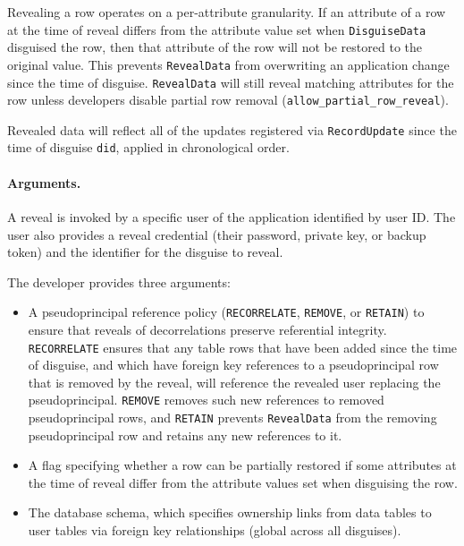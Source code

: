     Revealing a row operates on a per-attribute granularity. If an attribute of
    a row at the time of reveal differs from the attribute value set when
    \texttt{DisguiseData} disguised the row, then that attribute of the row will
    not be restored to the original value. This prevents \texttt{RevealData}
    from overwriting an application change since the time of disguise. 
    \texttt{RevealData} will still reveal matching attributes for the row unless
    developers disable partial row removal
    (\texttt{allow\_partial\_row\_reveal}).

    Revealed data will reflect all of the updates registered via
    \texttt{RecordUpdate} since the time of disguise \texttt{did}, applied in
    chronological order.

    \paragraph{Arguments.} 
    A reveal is invoked by a specific user of the application identified by user
    ID. 
    The user also provides a reveal credential (their password, private key, or
    backup token) and the identifier for the disguise to reveal.

    The developer provides three arguments:
    \begin{itemize}[nosep]
    \item A pseudoprincipal reference policy (\texttt{RECORRELATE}, \texttt{REMOVE},
    or \texttt{RETAIN}) to ensure that reveals of decorrelations preserve
    referential integrity. \texttt{RECORRELATE} ensures that any table rows that
    have been added since the time of disguise, and which have foreign
    key references to a pseudoprincipal row that is removed by the reveal, will
    reference the revealed user replacing the pseudoprincipal.
    \texttt{REMOVE} removes such new references to removed pseudoprincipal rows,
    and \texttt{RETAIN} prevents \texttt{RevealData} from the removing
    pseudoprincipal row and retains any new references to it.
     
    \item A flag specifying whether a row can be partially restored if some
    attributes at the time of reveal differ from the attribute values set when
    disguising the row.

    \item The database schema, which specifies ownership links from data tables to user
    tables via foreign key relationships (global across all disguises).
    \end{itemize}

